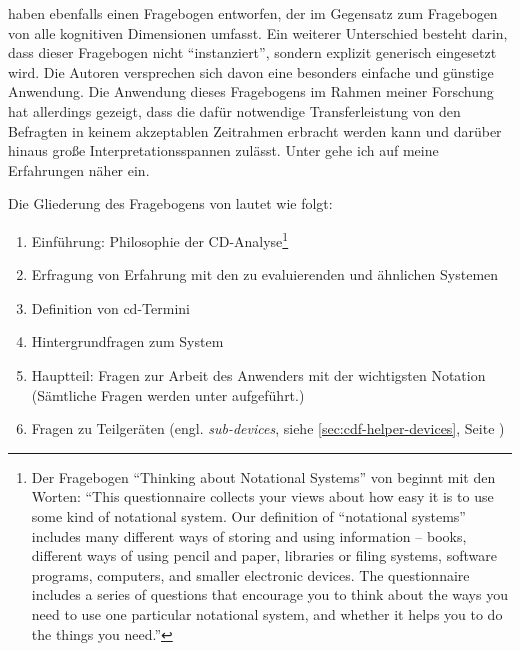 \begin{important}
\cite{161956} haben ebenfalls einen Fragebogen entworfen, der im Gegensatz zum Fragebogen von \cite{Kadoda:2000vj} alle kognitiven Dimensionen umfasst. Ein weiterer Unterschied besteht darin, dass dieser Fragebogen nicht ``instanziert'', sondern explizit generisch eingesetzt wird. Die Autoren versprechen sich davon eine besonders einfache und günstige Anwendung. Die Anwendung dieses Fragebogens im Rahmen meiner Forschung hat allerdings gezeigt, dass die dafür notwendige Transferleistung von den Befragten in keinem akzeptablen Zeitrahmen erbracht werden kann und darüber hinaus große Interpretationsspannen zulässt. Unter  gehe ich auf meine Erfahrungen näher ein.

Die Gliederung des Fragebogens von \cite{161956} lautet wie folgt:
\begin{enumerate}
\itemsep1pt\parskip0pt
\item Einführung: Philosophie der CD-Analyse\footnote{Der Fragebogen ``Thinking about Notational Systems'' von \cite{161956} beginnt mit den Worten: ``This questionnaire collects your views about how easy it is to use some kind of notational system. Our definition of ``notational systems'' includes many different ways of storing and using information – books, different ways of using pencil and paper, libraries or filing systems, software programs, computers, and smaller electronic devices. The questionnaire includes a series of questions that encourage you to think about the ways you need to use one particular notational system, and whether it helps you to do the things you need.''}
\item Erfragung von Erfahrung mit den zu evaluierenden und ähnlichen Systemen
\item Definition von \acrshort{cd}-Termini
\item Hintergrundfragen zum System
\item Hauptteil: Fragen zur Arbeit des Anwenders mit der wichtigsten Notation\\(Sämtliche Fragen werden unter  aufgeführt.)
\item Fragen zu Teilgeräten (engl. \textit{sub-devices}, siehe \ref{sec:cdf-helper-devices}, Seite \pageref{sec:cdf-helper-devices})
\end{enumerate}



\end{important}
